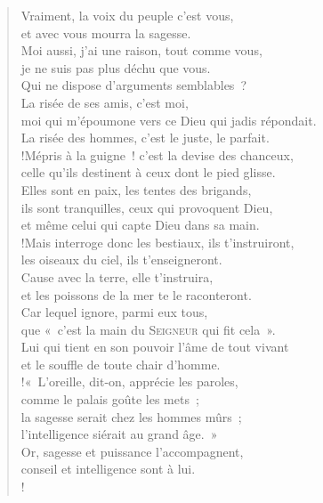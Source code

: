 \documentclass[french,twoside]{book} %
\def\mednobreak{\ifdim\lastskip<\medskipamount
  \removelastskip\nopagebreak\medskip\fi}
\newcommand{\labelblock}[1]{\medbreak{\noindent\color{rubric}\bfseries #1}\par\mednobreak}
\begin{document}
\begin{verse}
Vraiment, la voix du peuple c’est vous, \\
et avec vous mourra la sagesse.\\
Moi aussi, j’ai une raison, tout comme vous, \\
je ne suis pas plus déchu que vous. \\
Qui ne dispose d’arguments semblables ?\\
La risée de ses amis, c’est moi, \\
moi qui m’époumone vers ce Dieu qui jadis répondait. \\
La risée des hommes, c’est le juste, le parfait.\\!Mépris à la guigne ! c’est la devise des chanceux, \\
celle qu’ils destinent à ceux dont le pied glisse.\\
Elles sont en paix, les tentes des brigands, \\
ils sont tranquilles, ceux qui provoquent Dieu, \\
et même celui qui capte Dieu dans sa main.\\!Mais interroge donc les bestiaux, ils t’instruiront, \\
les oiseaux du ciel, ils t’enseigneront.\\
Cause avec la terre, elle t’instruira, \\
et les poissons de la mer te le raconteront.\\
Car lequel ignore, parmi eux tous, \\
que « c’est la main du {\scshape Seigneur} qui fit cela ».\\
Lui qui tient en son pouvoir l’âme de tout vivant \\
et le souffle de toute chair d’homme.\\!« L’oreille, dit-on, apprécie les paroles, \\
comme le palais goûte les mets ;\\
la sagesse serait chez les hommes mûrs ; \\
l’intelligence siérait au grand âge. »\\
Or, sagesse et puissance l’accompagnent, \\
conseil et intelligence sont à lui.\\!
\end{verse}

\labelblock{Le divin destructeur}
\end{document}
